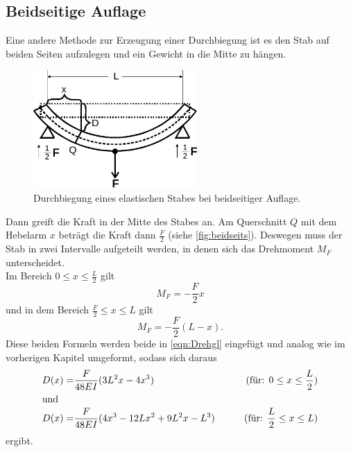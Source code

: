 \subsection{Beidseitige Auflage}

Eine andere Methode zur Erzeugung einer Durchbiegung ist es den Stab auf beiden Seiten aufzulegen und ein Gewicht in die Mitte zu hängen.
\begin{figure}[H]
  \centering
  \includegraphics[height=4.5cm]{content/beidseits.pdf}
  \caption{Durchbiegung eines elastischen Stabes bei beidseitiger Auflage.\cite[110]{V103}}
  \label{fig:beidseits}
\end{figure}
\noindent Dann greift die Kraft in der Mitte des Stabes an.
Am Querschnitt $Q$ mit dem Hebelarm $x$ beträgt die Kraft dann $\frac{F}{2}$ (siehe \autoref{fig:beidseits}). 
Deswegen muss der Stab in zwei Intervalle aufgeteilt werden, in denen sich das Drehmoment $M_F$ unterscheidet.\\
Im Bereich $ 0 \leq x \leq \frac{L}{2}$ gilt
\begin{equation}
  M_F = -\frac{F}{2}x
  \label{eqn:M_F1}
\end{equation}
und in dem Bereich $\frac{F}{2} \leq x \leq L$ gilt
\begin{equation}
  M_F = -\frac{F}{2}(L-x).
  \label{eqn:M_F2}
\end{equation}
Diese beiden Formeln werden beide in \autoref{eqn:Drehgl} eingefügt und analog wie im vorherigen Kapitel umgeformt, sodass sich daraus
\begin{align}
   D(x) = &\frac{F}{48EI}(3L^2x - 4x^3) &\qquad (\text{für: } 0 \leq x \leq \frac{L}{2})\label{eqn:Biegungbl}\\
\shortintertext{und}
   D(x) = &\frac{F}{48EI}(4x^3 - 12Lx^2 + 9L^2x -L^3) &\qquad (\text{für: } \frac{L}{2} \leq x \leq L)\label{eqn:Biegungbr}
\end{align}
ergibt.







